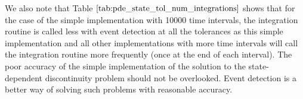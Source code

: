 We also note that Table $\ref{tab:pde_state_tol_num_integrations}$ shows that for the case of the simple implementation with 10000 time intervals, the integration routine is called less with event detection at all the tolerances as this simple implementation and all other implementations with more time intervals will call the integration routine more frequently (once at the end of each interval). The poor accuracy of the simple implementation of the solution to the state-dependent discontinuity problem should not be overlooked. Event detection is a better way of solving such problems with reasonable accuracy. 
%
%
